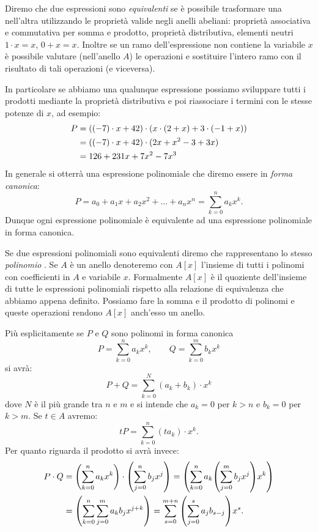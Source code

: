 Diremo che due espressioni sono \emph{equivalenti} se è possibile trasformare 
una nell'altra utilizzando le proprietà valide negli anelli abeliani: 
proprietà associativa 
e commutativa per somma e prodotto, proprietà distributiva, elementi 
neutri $1\cdot x = x$, $0 + x = x$.
Inoltre se un ramo dell'espressione non contiene la variabile $x$ è possibile valutare 
(nell'anello $A$) le operazioni e sostituire l'intero ramo con il 
risultato di tali operazioni (e viceversa).

In particolare se abbiamo una qualunque espressione possiamo sviluppare tutti i prodotti
mediante la proprietà distributiva e poi riassociare i termini 
con le stesse potenze di $x$, ad esempio:
\begin{align*}
P &= {\left( (-7)\cdot x+42 \right)}\cdot(x\cdot (2 + x)
+ 3\cdot(-1+x))\\
&= {\left( (-7)\cdot x + 42 \right)}\cdot (2x+x^2-3+3x) \\
&= 126 + 231 x + 7 x^2 - 7 x^3
\end{align*}
In generale si otterrà una espressione polinomiale che diremo 
essere in \emph{forma canonica}:
\[
  P = a_0 + a_1 x + a_2 x^2 + \dots + a_n x^n
       = \sum_{k=0}^n a_k x^k.
\]
Dunque ogni espressione polinomiale è equivalente ad una 
espressione polinomiale in forma canonica. 

Se due espressioni polinomiali sono equivalenti 
diremo che rappresentano lo stesso \emph{polinomio}%
%
.
Se $A$ è un anello denoteremo con 
$A[x]$ \index{$\KK[x]$}%
l'insieme di tutti i polinomi con coefficienti in $A$ e variabile $x$. 
Formalmente $A[x]$ è il quoziente dell'insieme 
di tutte le espressioni polinomiali rispetto alla relazione di equivalenza
che abbiamo appena definito. 
Possiamo fare la somma e il prodotto di polinomi e queste operazioni 
rendono $A[x]$ anch'esso un anello.

Più esplicitamente se $P$ e $Q$ sono polinomi in forma canonica
\[
  P = \sum_{k=0}^n a_k x^k, \qquad Q = \sum_{k=0}^m b_k x^k
\]
si avrà:
\[
  P + Q = \sum_{k=0}^{N} (a_k+b_k) \cdot x^k
\]
dove $N$ è il più grande tra $n$ e $m$ e si intende che $a_k=0$ per $k>n$ e 
$b_k=0$ per $k>m$.
Se $t\in A$ avremo:
\[
  t P = \sum_{k=0}^n (ta_k)\cdot x^k.
\]
Per quanto riguarda il prodotto si avrà invece:
\begin{align*}
  P\cdot Q
  &= {\left( \sum_{k=0}^n a_k x^k \right)}\cdot {\left( \sum_{j=0}^n b_j x^j \right)}
  = {\left( \sum_{k=0}^n a_k {\left( \sum_{j=0}^m b_j x^j \right)} x^k \right)} \\
  &= {\left( \sum_{k=0}^n \sum_{j=0}^m a_k b_j x^{j+k} \right)}
  = \sum_{s=0}^{m+n} {\left( \sum_{j=0}^s a_j b_{s-j} \right)} x^s.
\end{align*}

